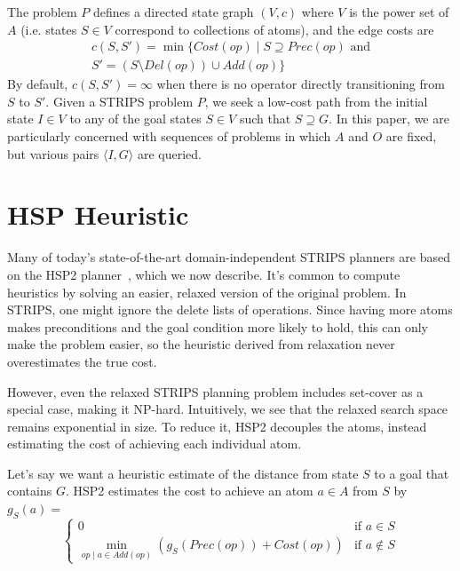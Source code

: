 \documentclass[letterpaper]{article}
\begin{document}
The problem $P$ defines a directed state graph $(V,c)$ where $V$ is the power set of $A$ (i.e. states $S\in V$ correspond to collections of atoms), and the edge costs are
\begin{eqnarray*} c(S,S') = \min\{Cost(op) \mid S\supseteq Prec(op)\text{ and}
\\S' = \left(S \setminus Del(op)\right) \cup Add(op)\} \end{eqnarray*}
By default, $c(S,S') = \infty$ when there is no operator directly transitioning from $S$ to $S'$.
Given a STRIPS problem $P$, we seek a low-cost path from the initial state $I\in V$ to any of the goal states $S\in V$ such that $S \supseteq G$. In this paper, we are particularly concerned with sequences of problems in which $A$ and $O$ are fixed, but various pairs $\langle I,G\rangle$ are queried.

\section{HSP Heuristic}

Many of today's state-of-the-art domain-independent STRIPS planners are based on the HSP2 planner~\cite{bonet2001planning}, which we now describe.
It's common to compute heuristics by solving an easier, relaxed version of the original problem. In STRIPS, one might ignore the delete lists of operations.
Since having more atoms makes preconditions and the goal condition more likely to hold, this can only make the problem easier, so the heuristic derived from relaxation never overestimates the true cost.

However, even the relaxed STRIPS planning problem includes set-cover as a special case, making it NP-hard.
Intuitively, we see that the relaxed search space remains exponential in size.
To reduce it, HSP2 decouples the atoms, instead estimating the cost of achieving each individual atom.

Let's say we want a heuristic estimate of the distance from state $S$ to a goal that contains $G$. HSP2 estimates the cost to achieve an atom $a\in A$ from $S$ by $g_S(a) = $
\[\begin{cases} 0  &\mbox{if } a \in S
\\ \min_{op\mid a\in Add(op)} \left(g_S(Prec(op)) + Cost(op)\right)  &\mbox{if } a \notin S \end{cases}\]
\end{document}
